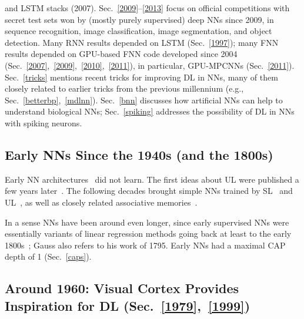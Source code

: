 \documentclass[letterpaper]{article}
\begin{document}
\begin{CJK*}{UTF8}{gbsn}
and LSTM stacks (2007).
Sec.~\ref{2009}--\ref{2013} focus on official competitions with secret test sets 
won by (mostly purely supervised) deep NNs since 2009,
in sequence recognition, image classification, image segmentation, and object detection.
Many RNN results depended on LSTM (Sec.~\ref{1997});
many FNN results depended on GPU-based FNN code developed since 2004 (Sec.~\ref{2007},~\ref{2009},~\ref{2010},~\ref{2011}),
in particular, GPU-MPCNNs  (Sec.~\ref{2011}). 
Sec.~\ref{tricks} mentions
recent tricks for improving DL in NNs, many of them closely
related to earlier tricks from the previous millennium (e.g., Sec.~\ref{betterbp},~\ref{mdlnn}).
Sec.~\ref{bnn} discusses how artificial NNs can  help to understand biological NNs;
Sec.~\ref{spiking} addresses the possibility of DL in NNs with spiking neurons.
 





\subsection{Early NNs Since the 1940s (and the 1800s)}
\label{1940}

Early NN architectures~\citep{mcculloch:43} did not learn.
The first ideas about UL were published a few years later~\citep{Hebb:49}.
The following decades brought simple NNs trained by SL~\citep[e.g.,][]{rosenblatt1958,Rosenblatt:62,adaline62,Narendra:74}
and UL~\citep[e.g.,][]{Grossberg69a,kohonen1972,malsburg1973,WillshawMalsburg:76},
as well as closely related associative memories~\citep[e.g.,][]{Palm:80,Hopfield:82}.

In a sense NNs have been around even longer, since
early supervised NNs  were essentially variants of 
linear regression methods going back at least to the early 1800s~\citep[e.g.,][]{legendre1805,gauss1809,gauss1821}; Gauss also refers to his work of 1795.
Early NNs had a maximal CAP depth of 1 (Sec.~\ref{caps}).



\subsection{Around 1960: Visual Cortex Provides Inspiration for DL (Sec.~\ref{1979},~\ref{1999})}
\label{1962}


\end{CJK*}
\end{document}
